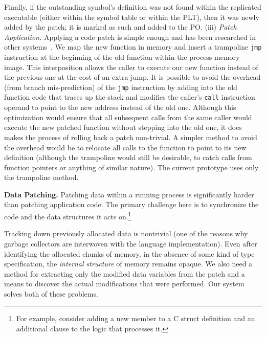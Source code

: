 Finally, if the outstanding symbol's definition was not found within
the replicated executable (either within the symbol table or within the PLT),
then it was newly added by the patch; it is marked as such and added
to the PO.
\newline
(iii) {\it Patch Application:} Applying a code patch is simple enough
and has been researched in other
systems~\cite{pannus,livepatch,ksplice,kaho}.  We map the new function
in memory and insert a trampoline {\tt jmp} instruction at the
beginning of the old function within the process memory image. This
interposition allows the caller to execute our new function instead of
the previous one at the cost of an extra jump.  It is possible to
avoid the overhead (from branch mis-prediction) of the {\tt jmp}
instruction by adding into the old function code that traces up the
stack and modifies the caller's {\tt call} instruction operand to
point to the new address instead of the old one. Although this
optimization would ensure that all subsequent calls from the same
caller would execute the new patched function without stepping into
the old one, it does makes the process of rolling back a patch
non-trivial. A simpler method to avoid the overhead would be to
relocate all calls to the function to point to its new definition
(although the trampoline would still be desirable, to catch calls from
function pointers or anything of similar nature). The current
prototype uses only the trampoline method.

{\bf Data Patching.} %
Patching data within a running process is significantly harder than
patching application code.  The primary challenge here is to
synchronize the code and the data structures it acts on.\footnote{For
  example, consider adding a new member to a C struct definition and
  an additional clause to the logic that processes it.}

Tracking down previously allocated data is nontrivial (one of the
reasons why garbage collectors are interwoven with the language
implementation).  Even after identifying the allocated chunks of
memory, in the absence of some kind of type specification, the {\it
  internal structure} of memory remains opaque.  We also need a method
for extracting only the modified data variables from the patch and a
means to discover the actual modifications that were performed. 
Our system solves both of these problems.

